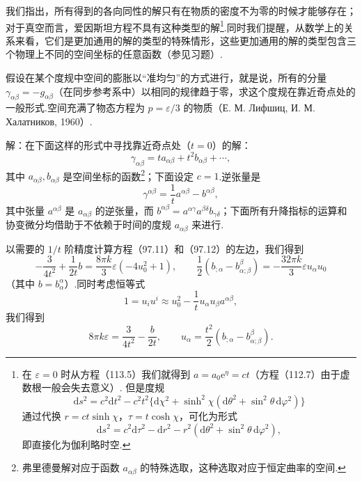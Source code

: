 我们指出，所有得到的各向同性的解只有在物质的密度不为零的时候才能够存在；对于真空而言，爱因斯坦方程不具有这种类型的解\footnote{在 $\varepsilon=0$ 时从方程（113.5）我们就得到 $a=a_{0}\mathrm{e}^{\eta}=ct$（方程（112.7）由于虚数根一般会失去意义）. 但是度规
\[
\mathrm{d}s^{2}=c^{2}\mathrm{d}t^{2}-c^{2}t^{2}\{\mathrm{d}\chi^{2}+\sinh^{2}\chi(\mathrm{d}\theta^{2}+\sin^{2}\theta\,\mathrm{d}\varphi^{2})\}
\]
通过代换 $r=ct\sinh\chi$，$\tau=t\cosh\chi$，可化为形式
\[
\mathrm{d}s^{2}=c^{2}\mathrm{d}\tau^{2}-\mathrm{d}r^{2}-r^{2}(\mathrm{d}\theta^{2}+\sin^{2}\theta\,\mathrm{d}\varphi^{2}),
\]
即直接化为伽利略时空.}.同时我们提醒，从数学上的关系来看，它们是更加通用的解的类型的特殊情形，这些更加通用的解的类型包含三个物理上不同的空间坐标的任意函数（参见习题）.

\begin{xiti}

\quad 假设在某个度规中空间的膨胀以“准均匀”的方式进行，就是说，所有的分量 $\gamma_{\alpha\beta}=-g_{\alpha\beta}$（在同步参考系中）以相同的规律趋于零，求这个度规在靠近奇点处的一般形式.空间充满了物态方程为 $p=\varepsilon/3$ 的物质（Е. М. Лифшиц, И. М. Халатников, 1960）.

解：在下面这样的形式中寻找靠近奇点处（$t=0$）的解：
\begin{equation}\tag{1}
  \gamma_{\alpha\beta}=ta_{\alpha\beta}+t^{2}b_{\alpha\beta}+\cdots,
\end{equation}
其中 $a_{\alpha\beta},b_{\alpha\beta}$ 是空间坐标的函数\footnote{弗里德曼解对应于函数 $a_{\alpha\beta}$ 的特殊选取，这种选取对应于恒定曲率的空间.}；下面设定 $c=1$.逆张量是
\begin{equation*}
  \gamma^{\alpha\beta}=\frac{1}{t}a^{\alpha\beta}-b^{\alpha\beta},
\end{equation*}
其中张量 $a^{\alpha\beta}$ 是 $a_{\alpha\beta}$ 的逆张量，而 $b^{\alpha\beta}=a^{\alpha\gamma}a^{\beta\delta}b_{\gamma\delta}$；下面所有升降指标的运算和协变微分均借助于不依赖于时间的度规 $a_{\alpha\beta}$ 来进行.

以需要的 $1/t$ 阶精度计算方程（97.11）和（97.12）的左边，我们得到
\begin{equation*}
  -\frac{3}{4t^{2}}+\frac{1}{2t}b=\frac{8\pi k}{3}\varepsilon(-4u_{0}^{2}+1),
  \qquad
  \frac{1}{2}(b_{;\alpha}-b_{\alpha;\beta}^{\beta})
  =-\frac{32\pi k}{3}\varepsilon u_{\alpha}u_{0}
\end{equation*}
（其中 $b=b_{\alpha}^{\alpha}$）.同时考虑恒等式
\begin{equation*}
  1=u_{i}u^{i}\approx u_{0}^{2}-\frac{1}{t}u_{\alpha}u_{\beta}a^{\alpha\beta},
\end{equation*}
我们得到
\begin{equation}\tag{2}
  8\pi k\varepsilon=\frac{3}{4t^{2}}-\frac{b}{2t},\qquad
  u_{\alpha}=\frac{t^{2}}{2}(b_{;\alpha}-b_{\alpha;\beta}^{\beta}).
\end{equation}


\end{xiti}
